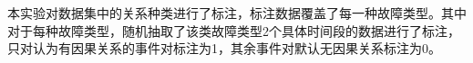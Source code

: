 本实验对数据集中的关系种类进行了标注，标注数据覆盖了每一种故障类型。其中对于每种故障类型，随机抽取了该类故障类型2个具体时间段的数据进行了标注，只对认为有因果关系的事件对标注为1，其余事件对默认无因果关系标注为0。

